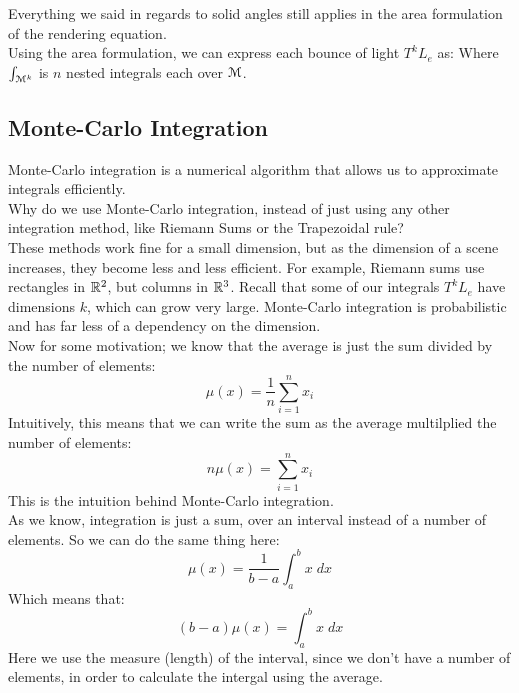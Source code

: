 \documentclass[12pt]{article}
\begin{document}
Everything we said in regards to solid angles still
applies in the area formulation of the rendering
equation. \\

Using the area formulation, we can express
each bounce of light $T^kL_e$ as:
Where $\int_{\mathcal{M}^k}$ is $n$ nested integrals
each over $\mathcal{M}$. \\

\newpage

\subsection*{Monte-Carlo Integration}

Monte-Carlo integration is a numerical
algorithm that allows us to approximate
integrals efficiently. \\

Why do we use Monte-Carlo
integration, instead of just using any
other integration method, like Riemann
Sums or the Trapezoidal rule? \\
These methods work fine for a small
dimension, but as the dimension of a scene
increases, they become less and less efficient. 
For example, Riemann sums use rectangles in
$\mathbb{R}^2$, but columns in $\mathbb{R}^3$.
Recall that some of our integrals
$T^kL_e$ have dimensions $k$,
which can grow very large.
Monte-Carlo integration is probabilistic
and has far less of a dependency
on the dimension. \\

Now for some motivation;
we know that the average is just the
sum divided by the number of elements:
\[ \mu(x) = \dfrac{1}{n}\sum_{i=1}^n x_i \]
Intuitively, this means that we can write
the sum as the average multilplied the number
of elements:
\[ n\mu(x) = \sum_{i=1}^n x_i \]
This is the intuition behind Monte-Carlo
integration. \\

As we know, integration is just a sum,
over an interval instead of a number of elements.
So we can do the same thing here:
\[ \mu(x) = \dfrac{1}{b-a}\int_a^b x \; dx \]
Which means that:
\[ (b-a)\mu(x) = \int_a^b x \; dx \]
Here we use the measure (length)
of the interval, since we don't have a number
of elements, in order to calculate the intergal
using the average. \\
\end{document}
